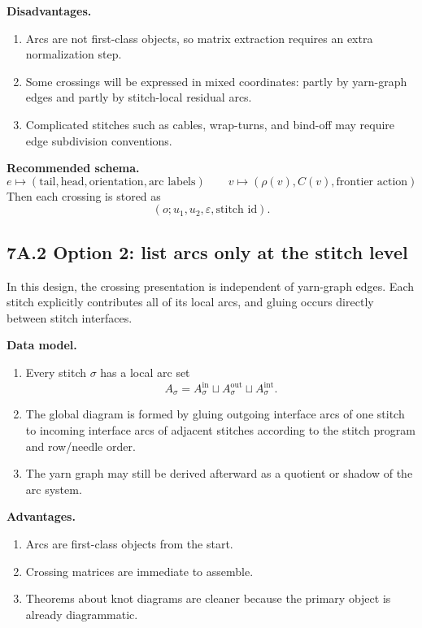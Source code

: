 \documentclass[11pt]{article}
\begin{document}
\textbf{Disadvantages.}
\begin{enumerate}[leftmargin=1.5em,itemsep=0.2em]
    \item Arcs are not first-class objects, so matrix extraction requires an extra normalization step.
    \item Some crossings will be expressed in mixed coordinates: partly by yarn-graph edges and partly by stitch-local residual arcs.
    \item Complicated stitches such as cables, wrap-turns, and bind-off may require edge subdivision conventions.
\end{enumerate}

\textbf{Recommended schema.}
\[
e \mapsto (\text{tail},\text{head},\text{orientation},\text{arc labels})
\qquad
v \mapsto (\rho(v), C(v), \text{frontier action})
\]
Then each crossing is stored as
\[
(o;u_1,u_2,\varepsilon,\text{stitch id}).
\]

\subsection*{7A.2 Option 2: list arcs only at the stitch level}
In this design, the crossing presentation is independent of yarn-graph edges. Each stitch explicitly contributes all of its local arcs, and gluing occurs directly between stitch interfaces.

\textbf{Data model.}
\begin{enumerate}[leftmargin=1.5em,itemsep=0.2em]
    \item Every stitch \(\sigma\) has a local arc set
    \[
    A_\sigma = A^{\mathrm{in}}_\sigma \sqcup A^{\mathrm{out}}_\sigma \sqcup A^{\mathrm{int}}_\sigma.
    \]
    \item The global diagram is formed by gluing outgoing interface arcs of one stitch to incoming interface arcs of adjacent stitches according to the stitch program and row/needle order.
    \item The yarn graph may still be derived afterward as a quotient or shadow of the arc system.
\end{enumerate}

\textbf{Advantages.}
\begin{enumerate}[leftmargin=1.5em,itemsep=0.2em]
    \item Arcs are first-class objects from the start.
    \item Crossing matrices are immediate to assemble.
    \item Theorems about knot diagrams are cleaner because the primary object is already diagrammatic.
\end{enumerate}
\end{document}

